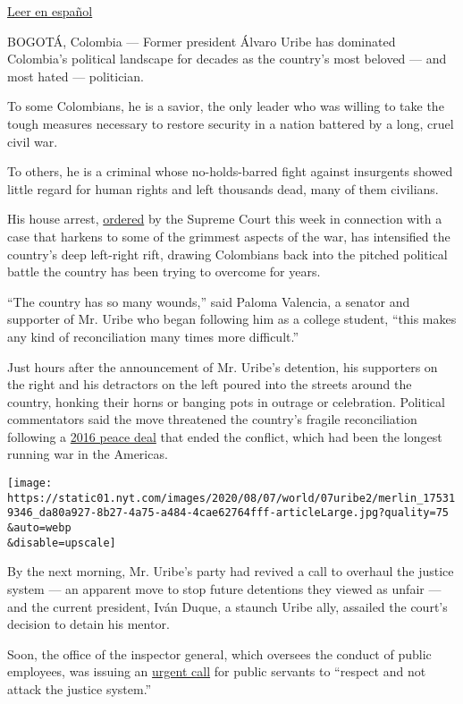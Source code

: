 \href{https://www.nytimes.com/es/2020/08/07/espanol/america-latina/alvaro-uribe-colombia.html}{Leer
en español}

BOGOTÁ, Colombia --- Former president Álvaro Uribe has dominated
Colombia's political landscape for decades as the country's most beloved
--- and most hated --- politician.

To some Colombians, he is a savior, the only leader who was willing to
take the tough measures necessary to restore security in a nation
battered by a long, cruel civil war.

To others, he is a criminal whose no-holds-barred fight against
insurgents showed little regard for human rights and left thousands
dead, many of them civilians.

His house arrest,
\href{https://www.nytimes.com/2020/08/04/world/americas/colombia-president-uribe-charged.html}{ordered}
by the Supreme Court this week in connection with a case that harkens to
some of the grimmest aspects of the war, has intensified the country's
deep left-right rift, drawing Colombians back into the pitched political
battle the country has been trying to overcome for years.

``The country has so many wounds,'' said Paloma Valencia, a senator and
supporter of Mr. Uribe who began following him as a college student,
``this makes any kind of reconciliation many times more difficult.''

Just hours after the announcement of Mr. Uribe's detention, his
supporters on the right and his detractors on the left poured into the
streets around the country, honking their horns or banging pots in
outrage or celebration. Political commentators said the move threatened
the country's fragile reconciliation following a
\href{https://www.nytimes.com/2016/08/25/world/americas/colombia-farc-peace-deal.html}{2016
peace deal} that ended the conflict, which had been the longest running
war in the Americas.

\texttt{[image: https://static01.nyt.com/images/2020/08/07/world/07uribe2/merlin\_175319346\_da80a927-8b27-4a75-a484-4cae62764fff-articleLarge.jpg?quality=75\\\&auto=webp\\\&disable=upscale]}

By the next morning, Mr. Uribe's party had revived a call to overhaul
the justice system --- an apparent move to stop future detentions they
viewed as unfair --- and the current president, Iván Duque, a staunch
Uribe ally, assailed the court's decision to detain his mentor.

Soon, the office of the inspector general, which oversees the conduct of
public employees, was issuing an
\href{https://twitter.com/PGN_COL/status/1291128939382022145}{urgent
call} for public servants to ``respect and not attack the justice
system.''

